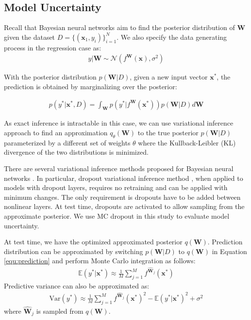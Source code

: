 \documentclass[letterpaper]{article} %
\newcommand{\vect}[1]{\mathbf{#1}}
\newcommand{\matr}[1]{\mathbf{#1}}
\newcommand{\vx}[0]{\vect{x}}
\newcommand{\E}{\mathbb{E}}
\newcommand{\N}{\mathcal{N}}
\newcommand{\mW}[0]{\matr{W}}
\begin{document}
\subsection{Model Uncertainty}
Recall that Bayesian neural networks aim to find the posterior distribution of $\mW$ given the dataset $D=\{(\vx_1,y_i)\}_{i=1}^N$. We also specify the data generating process in the regression case as:
\begin{align}
y|\mW \sim \N(f^\mW(\vx), \sigma^2)
\end{align}

With the posterior distribution $p(\mW|D)$, given a new input vector $\vx^*$, the prediction is obtained by marginalizing over the posterior:

\begin{align}
\label{equ:prediction}
p(y^*|\vx^*,D)=\int_\mW{p\left(y^*|f^\mW(\vx^*)\right)p(\mW|D)d\mW}
\end{align}

As exact inference is intractable in this case, we can use variational inference approach to find an approximation $q_\theta(\mW)$ to the true posterior $p(\mW|D)$ parameterized by a different set of weights $\theta$ where the Kullback-Leibler (KL) divergence of the two distributions is minimized.

There are several variational inference methods proposed for Bayesian neural networks \cite{hernandez2015probabilistic,blundell2015weight,gal2016dropout}. In particular, dropout variational inference method \cite{gal2016dropout}, when applied to models with dropout layers, requires no retraining and can be applied with minimum changes. The only requirement is dropouts have to be added between nonlinear layers. At test time, dropouts are activated to allow sampling from the approximate posterior. We use MC dropout in this study to evaluate model uncertainty.



At test time, we have the optimized approximated posterior $q(\mW)$. Prediction distribution can be approximated by switching $p(\mW|D)$ to $q(\mW)$ in Equation \ref{equ:prediction} and perform Monte Carlo integration as follows:
\begin{align}
\E(y^*|\vx^*)\approx\frac{1}{M}\sum_{j=1}^Mf^{\widehat{\mW}_j}(\vx^*)
\end{align}
Predictive variance can also be approximated as:
\begin{align}
\label{equ:var1}
\text{Var}\left(y^*\right)\approx \frac{1}{M}\sum_{j=1}^Mf^{\widehat{\mW}_j}(\vx^*)^2-\E(y^*|\vx^*)^2 +\sigma^2
\end{align}
where $\widehat{\mW}_j$ is sampled from $q(\mW)$.
\end{document}
